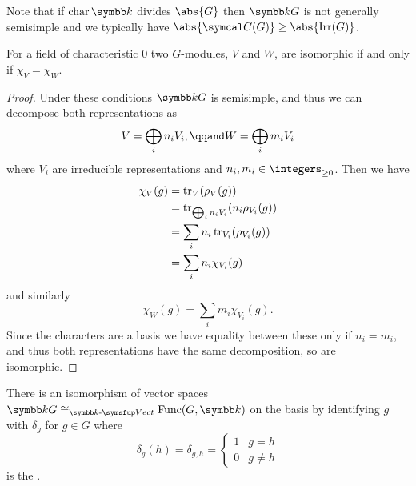 Note that if \(\Char \field\) divides \(\abs{G}\) then \(\field G\) is not generally semisimple and we typically have \(\abs{\conjugacyClasses(G)} \ge \abs{\Irr(G)}\).

\begin{crl}{}{}
    For a field of characteristic \(0\) two \(G\)-modules, \(V\) and \(W\), are isomorphic if and only if \(\chi_V = \chi_W\).
    \begin{proof}
        Under these conditions \(\field G\) is semisimple, and thus we can decompose both representations as
        \begin{equation}
            V = \bigoplus_i n_i V_i, \qqand W = \bigoplus_i m_i V_i
        \end{equation}
        where \(V_i\) are irreducible representations and \(n_i, m_i \in \integers_{\ge 0}\).
        Then we have
        \begin{align}
            \chi_V(g) &= \operatorname{tr}_V(\rho_V(g))\\
            &= \operatorname{tr}_{\bigoplus_i n_i V_i}(n_i\rho_{V_i}(g))\\
            &= \sum_{i} n_i \operatorname{tr}_{V_i}(\rho_{V_i}(g))\\
            &= \sum_i n_i \chi_{V_i}(g)
        \end{align}
        and similarly
        \begin{equation}
            \chi_W(g) = \sum_i m_i \chi_{V_i}(g).
        \end{equation}
        Since the characters are a basis we have equality between these only if \(n_i = m_i\), and thus both representations have the same decomposition, so are isomorphic.
    \end{proof}
\end{crl}

There is an isomorphism of vector spaces \(\field G \isomorphic_{\Vect} \Func(G, \field)\) on the basis by identifying \(g\) with \(\delta_g\) for \(g \in G\) where
\begin{equation}
    \delta_g(h) = \delta_{g,h} = 
    \begin{cases}
        1 & g = h\\
        0 & g \ne h
    \end{cases}
\end{equation}
is the .

